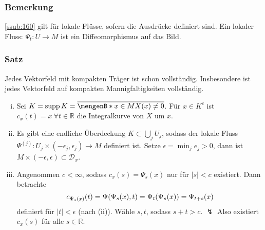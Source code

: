 \subsubsection{Bemerkung}
\label{ssub:161}
\ref{ssub:160} gilt für lokale Flüsse, sofern die Ausdrücke definiert sind. Ein lokaler Fluss: $\Psi_t:U\to M$ ist ein Diffeomorphismus auf das Bild.

\subsubsection{Satz}
\label{ssub:162}
Jedes Vektorfeld mit kompakten Träger ist schon vollständig. Insbesondere ist jedes Vektorfeld auf kompakten Mannigfaltigkeiten vollständig.
\begin{enumerate}[(i)]
\item 
{}
Sei $K = \supp K = \overline{\set[x\in M]{X(x)\neq 0}}$. Für $x\in K^c$ ist $c_x(t) = x\ \forall t\in \mathds{R}$ die Integralkurve von $X$ um $x$.
\item Es gibt eine endliche Überdeckung $K\subset \bigcup_j U_j$, sodass der lokale Fluss $\Psi^{(j)}: U_j\times (-\epsilon_j,\epsilon_j) \to M$ definiert ist. Setze $\epsilon = \min_j e_j > 0$, dann ist $M\times (-\epsilon,\epsilon)\subset \mathcal{D}_x$.
\item Angenommen $c < \infty$, sodass $c_x(s) = \Psi_s (x)$ nur für $|s| < c$ existiert. Dann betrachte
\[
c_{\Psi_s(x)} (t) = \Psi(\Psi_s (x), t) = \Psi_t(\Psi_s(x)) =\Psi_{t+s} (x)
\]
definiert für $|t| < \epsilon$ (nach (ii)). Wähle $s, t$, sodass $s+t > c$. $\lightning$ Also existiert $c_x(s)$ für alle $s\in \mathds{R}$.
\end{enumerate}


